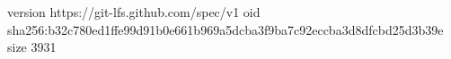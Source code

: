 version https://git-lfs.github.com/spec/v1
oid sha256:b32c780ed1ffe99d91b0e661b969a5dcba3f9ba7c92eccba3d8dfcbd25d3b39e
size 3931
